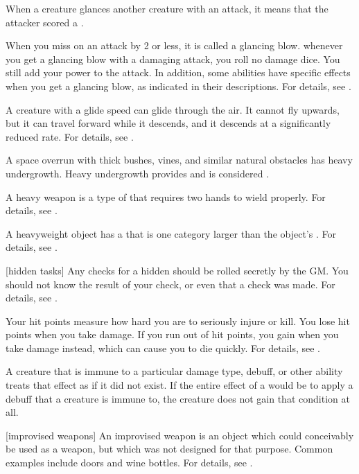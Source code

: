  When a creature glances another creature with an attack, it means that the attacker scored a .

 When you miss on an attack by 2 or less, it is called a glancing blow.
whenever you get a glancing blow with a damaging attack, you roll no damage dice.
You still add your power to the attack.
In addition, some abilities have specific effects when you get a glancing blow, as indicated in their descriptions.
For details, see .

 A creature with a glide speed can glide through the air.
It cannot fly upwards, but it can travel forward while it descends, and it descends at a significantly reduced rate.
For details, see .

 A space overrun with thick bushes, vines, and similar natural obstacles has heavy undergrowth.
Heavy undergrowth provides  and is considered .

 A heavy weapon is a type of  that requires two hands to wield properly.
For details, see .

 A heavyweight object has a  that is one category larger than the object's .
For details, see .

[hidden tasks] Any checks for a hidden  should be rolled secretly by the GM.\@
You should not know the result of your check, or even that a check was made.
For details, see .

 Your hit points measure how hard you are to seriously injure or kill.
You lose hit points when you take damage.
If you run out of hit points, you gain  when you take damage instead, which can cause you to die quickly.
For details, see .

 A creature that is immune to a particular damage type, debuff, or other ability treats that effect as if it did not exist.
If the entire effect of a  would be to apply a debuff that a creature is immune to, the creature does not gain that condition at all.

[improvised weapons] An improvised weapon is an object which could conceivably be used as a weapon, but which was not designed for that purpose.
Common examples include doors and wine bottles.
For details, see .


